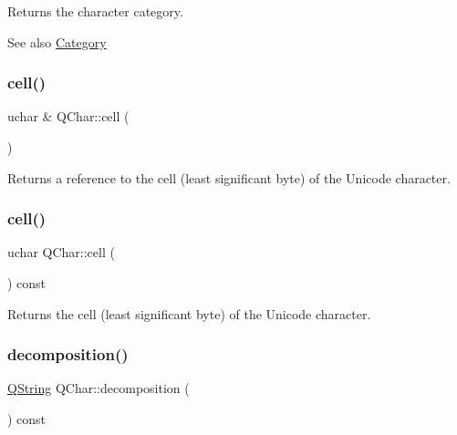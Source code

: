 Returns the character category.

\begin{DoxySeeAlso}{See also}
\mbox{\hyperlink{class_q_char_a62908095db0c54f35ff2ae928c621a97}{Category}} 
\end{DoxySeeAlso}
\mbox{\label{class_q_char_a2475b4653bed4cf2a3f10395a14cc9c5}} 
\subsubsection{\texorpdfstring{cell()}{cell()}\hspace{0.1cm}{\footnotesize\ttfamily [1/2]}}
{\footnotesize\ttfamily uchar \& Q\+Char\+::cell (\begin{DoxyParamCaption}{ }\end{DoxyParamCaption})\hspace{0.3cm}{\ttfamily [inline]}}

Returns a reference to the cell (least significant byte) of the Unicode character. \mbox{\label{class_q_char_a44b4ebc60a4263918bf8f0dfcea49fa6}} 
\subsubsection{\texorpdfstring{cell()}{cell()}\hspace{0.1cm}{\footnotesize\ttfamily [2/2]}}
{\footnotesize\ttfamily uchar Q\+Char\+::cell (\begin{DoxyParamCaption}{ }\end{DoxyParamCaption}) const\hspace{0.3cm}{\ttfamily [inline]}}

Returns the cell (least significant byte) of the Unicode character. \mbox{\label{class_q_char_a8b40234fbb8bcb58ba2086a610883b7b}} 
\subsubsection{\texorpdfstring{decomposition()}{decomposition()}}
{\footnotesize\ttfamily \mbox{\hyperlink{class_q_string}{Q\+String}} Q\+Char\+::decomposition (\begin{DoxyParamCaption}{ }\end{DoxyParamCaption}) const}

